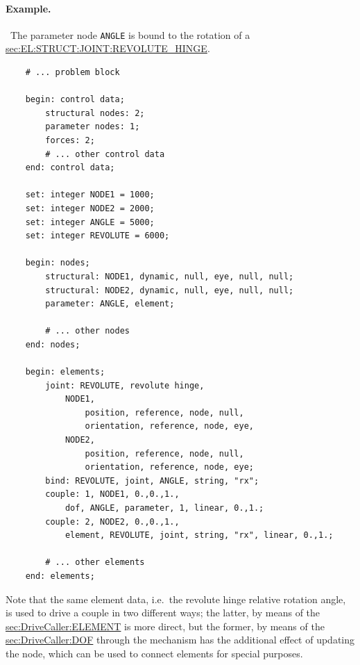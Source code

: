 \paragraph{Example.} \
The parameter node \texttt{ANGLE} is bound to the rotation of a 
\hyperref{\kw{revolute hinge}}{\kw{revolute hinge} (see Section~}{)}{sec:EL:STRUCT:JOINT:REVOLUTE_HINGE}.
\begin{verbatim}
    # ... problem block

    begin: control data;
        structural nodes: 2;
        parameter nodes: 1;
        forces: 2;
        # ... other control data
    end: control data;

    set: integer NODE1 = 1000;
    set: integer NODE2 = 2000;
    set: integer ANGLE = 5000;
    set: integer REVOLUTE = 6000;

    begin: nodes;
        structural: NODE1, dynamic, null, eye, null, null;
        structural: NODE2, dynamic, null, eye, null, null;
        parameter: ANGLE, element;

        # ... other nodes
    end: nodes;

    begin: elements;
        joint: REVOLUTE, revolute hinge,
            NODE1,
                position, reference, node, null,
                orientation, reference, node, eye,
            NODE2,
                position, reference, node, null,
                orientation, reference, node, eye;
        bind: REVOLUTE, joint, ANGLE, string, "rx";
        couple: 1, NODE1, 0.,0.,1.,
            dof, ANGLE, parameter, 1, linear, 0.,1.;
        couple: 2, NODE2, 0.,0.,1.,
            element, REVOLUTE, joint, string, "rx", linear, 0.,1.;

        # ... other elements
    end: elements;
\end{verbatim}
Note that the same element data, i.e.\ the revolute hinge
relative rotation angle, is used to drive a couple in two different
ways; the latter, by means of the 
\hyperref{\kw{element} drive}{\kw{element} drive (see Section~}{)}{sec:DriveCaller:ELEMENT}
is more direct, but the former, by means of the 
\hyperref{\kw{dof} drive}{\kw{dof} drive (see Section~}{)}{sec:DriveCaller:DOF}
through the \kw{bind} mechanism has the additional effect of updating
the \kw{parameter} node, which can be used to connect
 elements for special purposes.

